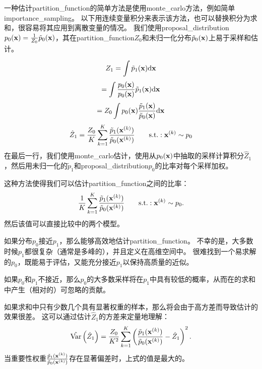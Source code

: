 一种估计\gls{partition_function}的简单方法是使用\gls{monte_carlo}方法，例如简单\gls{importance_sampling}。
以下用连续变量积分来表示该方法，也可以替换积分为求和，很容易将其应用到离散变量的情况。
我们使用\gls{proposal_distribution}$p_0(\mathbf{x}) = \frac{1}{Z_0} \tilde{p}_0( \mathbf{x})$，其在\gls{partition_function}$Z_0$和未归一化分布$\tilde{p}_0(\mathbf{x})$上易于采样和估计。


\begin{equation}
	Z_1 = \int \tilde{p}_1 (\mathbf{x}) \mathrm{d} \mathbf{x} 
\end{equation}
\begin{equation}
	= \int  \frac{ p_0(\mathbf{x}) }{ p_0(\mathbf{x}) }   \tilde{p}_1 (\mathbf{x}) \mathrm{d} \mathbf{x} 
\end{equation}
\begin{equation}
	= Z_0 \int  p_0(\mathbf{x})   \frac{ \tilde{p}_1 (\mathbf{x}) }{ \tilde{p}_0 (\mathbf{x}) } \mathrm{d} \mathbf{x} 
\end{equation}
\begin{equation}
\label{eq:18.44}
	\hat{Z}_1 = \frac{Z_0}{K} \sum_{k=1}^K \frac{ \tilde{p}_1(\mathbf{x}^{(k)})  }{ \tilde{p}_0(\mathbf{x}^{(k)}) }  \quad\quad \text{s.t.}: \mathbf{x}^{(k)} \sim p_0
\end{equation}
在最后一行，我们使用\gls{monte_carlo}估计，使用从$p_0(\mathbf{x})$中抽取的采样计算积分$\hat{Z}_1$，然后用未归一化的$\tilde{p}_1$和\gls{proposal_distribution}$p_0$的比率对每个采样加权。


这种方法使得我们可以估计\gls{partition_function}之间的比率：
\begin{equation}
	\frac{1}{K} \sum_{k=1}^K \frac{ \tilde{p}_1 (\mathbf{x}^{(k)}) }{ \tilde{p}_0 (\mathbf{x}^{(k)}) }
	\quad\quad \text{s.t.}: \mathbf{x}^{(k)} \sim p_0.
\end{equation}
然后该值可以直接比较中的两个模型。


如果分布$p_0$接近$p_1$，那么能够高效地估计\gls{partition_function}\citep{Minka_2005}。
不幸的是，大多数时候$p_1$都很复杂（通常是多峰的），并且定义在高维空间中。
很难找到一个易求解的$p_0$，既能易于评估，又能充分接近$p_1$以保持高质量的近似。


如果$p_0$和$p_1$不接近，那么$p_0$的大多数采样将在$p_1$中具有较低的概率，从而在的求和中产生（相对的）可忽略的贡献。


如果求和中只有少数几个具有显著权重的样本，那么将会由于高方差而导致估计的效果很差。
这可以通过估计$\hat{Z}_1$的方差来定量地理解：
\begin{equation}
	\hat{\text{Var}} \left( \hat{Z}_1 \right)  = \frac{Z_0 }{K^2} \sum_{k=1}^K
\left(  \frac{ \tilde{p}_1(\mathbf{x}^{(k)}) }{  \tilde{p}_0(\mathbf{x}^{(k)}) } - \hat{Z}_1  \right)^2.
\end{equation}
当重要性权重$\frac{ \tilde{p}_1(\mathbf{x}^{(k)}) }{ \tilde{p}_0(\mathbf{x}^{(k)}) } $存在显著偏差时，上式的值是最大的。

